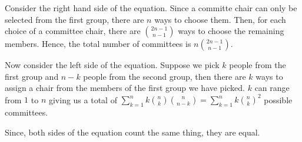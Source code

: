 Consider the right hand side of the equation. Since a committe chair can only be selected from the first group, there are $n$ ways to choose them. Then, for each choice of a committee chair, there are ${2n-1 \choose n-1}$ ways to choose the remaining members. Hence, the total number of committees is $n{2n-1 \choose n-1}$.

Now consider the left side of the equation. Suppose we pick $k$ people from the first group and $n-k$ people from the second group, then there are $k$ ways to assign a chair from the members of the first group we have picked. $k$ can range from $1$ to $n$ giving us a total of $\sum_{k=1}^{n} k{n \choose k}{n \choose n-k} = \sum_{k=1}^{n} k{n \choose k}^{2}$ possible committees.

Since, both sides of the equation count the same thing, they are equal.